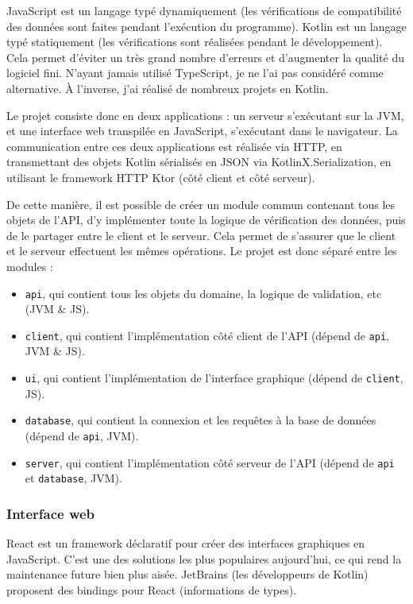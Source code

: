 \documentclass[11pt,french]{memoir}
\begin{document}
	JavaScript est un langage typé dynamiquement (les vérifications de compatibilité des données sont faites pendant l’exécution du programme).
	Kotlin est un langage typé statiquement (les vérifications sont réalisées pendant le développement).
	Cela permet d’éviter un très grand nombre d’erreurs et d’augmenter la qualité du logiciel fini.
	N’ayant jamais utilisé TypeScript, je ne l’ai pas considéré comme alternative.
	À l'inverse, j'ai réalisé de nombreux projets en Kotlin.

	\uparagraph
	Le projet consiste donc en deux applications : un serveur s’exécutant sur la JVM, et une interface web transpilée en JavaScript, s’exécutant dans le navigateur.
	La communication entre ces deux applications est réalisée via HTTP, en transmettant des objets Kotlin sérialisés en JSON via KotlinX.Serialization, en utilisant le framework HTTP Ktor (côté client et côté serveur).

	De cette manière, il est possible de créer un module commun contenant tous les objets de l’API, d’y implémenter toute la logique de vérification des données, puis de le partager entre le client et le serveur.
	Cela permet de s’assurer que le client et le serveur effectuent les mêmes
	opérations.
	Le projet est donc séparé entre les modules :
	\begin{itemize}
		\item \lstinline{api}, qui contient tous les objets du domaine, la logique de validation, etc (JVM \& JS).
		\item \lstinline{client}, qui contient l’implémentation côté client de l’API (dépend de \lstinline{api}, JVM \& JS).
		\item \lstinline{ui}, qui contient l’implémentation de l’interface graphique (dépend de \lstinline{client}, JS).
		\item \lstinline{database}, qui contient la connexion et les requêtes à la base de données (dépend de \lstinline{api}, JVM).
		\item \lstinline{server}, qui contient l’implémentation côté serveur de l’API (dépend de \lstinline{api} et \lstinline{database}, JVM).
	\end{itemize}

	\subsubsection{Interface web}

	React est un framework déclaratif pour créer des interfaces graphiques en JavaScript.
	C’est une des solutions les plus populaires aujourd’hui, ce qui rend la maintenance future bien plus aisée.
	JetBrains (les développeurs de Kotlin) proposent des bindings pour React (informations de types).
\end{document}
